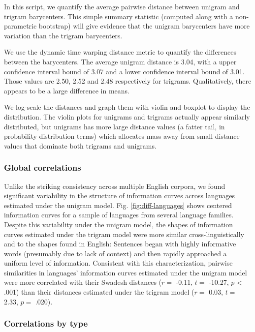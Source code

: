 \documentclass[
  english,
  man,floatsintext]{apa6}
\begin{document}
In this script, we quantify the average pairwise distance between unigram and trigram barycenters. This simple summary statistic (computed along with a non-parametric bootstrap) will give evidence that the unigram barycenters have more variation than the trigram barycenters.

We use the dynamic time warping distance metric to quantify the differences between the barycenters. The average unigram distance is 3.04, with a upper confidence interval bound of 3.07 and a lower confidence interval bound of 3.01. Those values are 2.50, 2.52 and 2.48 respectively for trigrams. Qualitatively, there appears to be a large difference in means.

We log-scale the distances and graph them with violin and boxplot to display the distribution. The violin plots for unigrams and trigrams actually appear similarly distributed, but unigrams has more large distance values (a fatter tail, in probability distribution terms) which allocates mass away from small distance values that dominate both trigrams and unigrams.

\hypertarget{global-correlations}{%
\subsubsection{Global correlations}\label{global-correlations}}

Unlike the striking consistency across multiple English corpora, we found significant variability in the structure of information curves across languages estimated under the unigram model. Fig. \ref{fig:diff-languages} shows centered information curves for a sample of languages from several language families. Despite this variability under the unigram model, the shapes of information curves estimated under the trigram model were more similar cross-linguistically and to the shapes found in English: Sentences began with highly informative words (presumably due to lack of context) and then rapidly approached a uniform level of information. Consistent with this characterization, pairwise similarities in languages' information curves estimated under the unigram model were more correlated with their Swadesh distances (\(r =\) -0.11, \(t =\) -10.27, \(p\) \textless{} .001) than their distances estimated under the trigram model (\(r =\) 0.03, \(t =\) 2.33, \(p =\) .020).

\hypertarget{correlations-by-type}{%
\subsubsection{Correlations by type}\label{correlations-by-type}}
\end{document}
